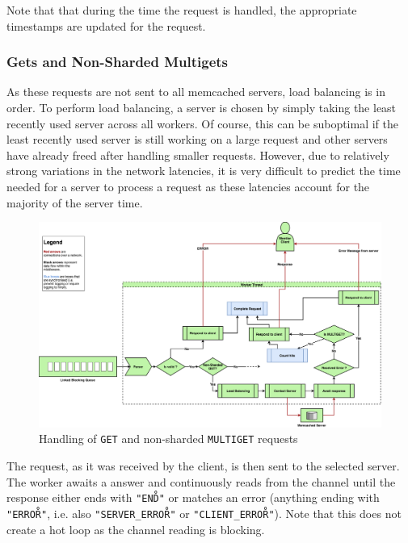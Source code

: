 \documentclass[11pt,a4paper]{article}
\begin{document}
Note that that during the time the request is handled, the appropriate timestamps are updated for the request.

\subsubsection{Gets and Non-Sharded Multigets}
As these requests are not sent to all memcached servers, load balancing is in order. To perform load balancing, a server is chosen by simply taking the least recently used server across all workers. Of course, this can be suboptimal if the least recently used server is still working on a large request and other servers have already freed after handling smaller requests. However, due to relatively strong variations in the network latencies, it is very difficult to predict the time needed for a server to process a request as these latencies account for the majority of the server time.

\begin{figure}[h]
    \centering
    \includegraphics[width=\textwidth]{processing/graphics/gets_handling.png}
    \caption{Handling of \texttt{GET} and non-sharded \texttt{MULTIGET} requests}
    \label{png::gets_handling}
\end{figure}

The request, as it was received by the client, is then sent to the selected server. The worker awaits a answer and continuously reads from the channel until the response either ends with \texttt{"END\r\n"} or matches an error (anything ending with \texttt{"ERROR\r\n"}, i.e. also \texttt{"SERVER_ERROR\r\n"} or \texttt{"CLIENT_ERROR\r\n"}). Note that this does not create a hot loop as the channel reading is blocking.
\end{document}
